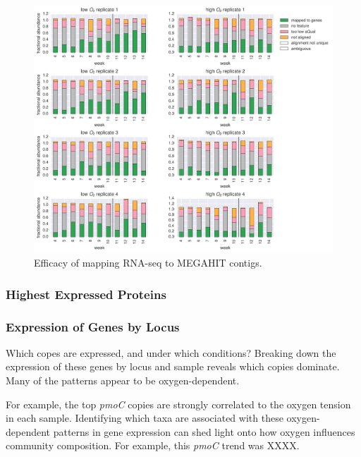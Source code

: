 \begin{figure}[H]
\centering
    \includegraphics[width=1.0\textwidth]{./tex/chapter2/figures/170316_fracs_mapped_unmapped_etc.pdf}
    \begin{singlespace}
    \caption[Efficacy of mapping RNA-seq to MEGAHIT contigs]{
        Efficacy of mapping RNA-seq to MEGAHIT contigs.}
    \label{fig:rna_mapping_bars}
    \end{singlespace}
\end{figure}

\subsubsection{Highest Expressed Proteins}

\subsubsection{Expression of Genes by Locus}

Which copes are expressed, and under which conditions?
Breaking down the expression of these genes by locus and sample reveals which copies dominate.
Many of the patterns appear to be oxygen-dependent.

For example, the top \textit{pmoC} copies are strongly correlated to the oxygen tension in each sample.
Identifying which taxa are associated with these oxygen-dependent patterns in gene expression can shed light onto how oxygen influences community composition.
For example, this \textit{pmoC} trend was XXXX. %


